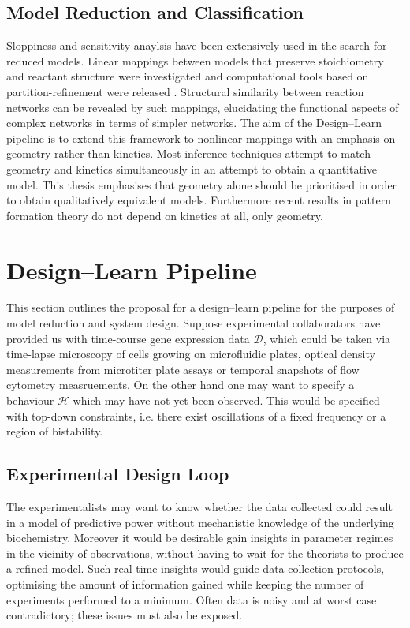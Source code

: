 \subsection{Model Reduction and Classification}
Sloppiness and sensitivity anaylsis have been extensively used in the
search for reduced models. Linear
mappings between models that preserve stoichiometry and reactant structure were
investigated \cite{Cardelli2014MorphismsFunction,Cardelli2017MaximalSystems} and
computational tools based on partition-refinement were released
\cite{Cardelli2017ERODE:Equations}. Structural similarity between reaction
networks can be revealed by such mappings, elucidating the functional aspects of
complex networks in terms of simpler networks. The aim of the Design--Learn
pipeline is to extend this framework to nonlinear mappings with an emphasis on
geometry rather than kinetics. Most inference techniques attempt to match
geometry and kinetics simultaneously in an attempt to obtain a quantitative
model. This thesis emphasises that geometry alone should be prioritised in
order to obtain qualitatively equivalent models. Furthermore recent
results in pattern formation theory \cite{Halatek2018} do not depend
on kinetics at all, only geometry.

\section{Design--Learn Pipeline}
\label{section:design-learn}

This section outlines the proposal for a design--learn pipeline for
the purposes of model reduction and system design. Suppose experimental
collaborators have provided us with time-course gene expression data $\mathcal{D}$,
which could be taken via time-lapse microscopy of cells growing on microfluidic plates,
optical density measurements from microtiter plate assays or temporal snapshots of
flow cytometry measruements. On the other hand one may want to specify a behaviour
$\mathcal{H}$ which may have not yet been observed. This would be specified with
top-down constraints, i.e. there exist oscillations of a fixed frequency or
a region of bistability.

\subsection{Experimental Design Loop}
\label{section:experimental-design}

The experimentalists may want to know whether the data collected could
result in a model of predictive power without mechanistic knowledge
of the underlying biochemistry. Moreover it would be desirable gain insights
in parameter regimes in the vicinity of observations, without having to
wait for the theorists to produce a refined model. Such real-time insights
would guide data collection protocols, optimising the amount of information
gained while keeping the number of experiments performed to a minimum. Often
data is noisy and at worst case contradictory; these issues must also be exposed.

